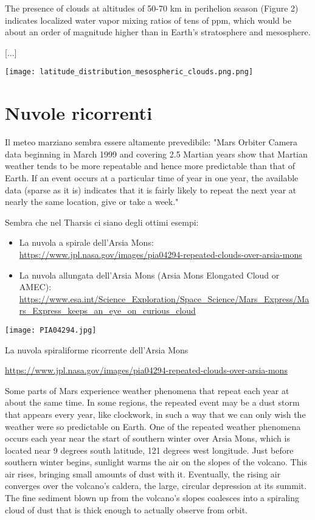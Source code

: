 \documentclass[a4paper,10pt,openany,oneside]{memoir}
\begin{document}
The presence of clouds at altitudes of 50-70 km in perihelion season (Figure 2) indicates localized water vapor mixing ratios of tens of ppm, which would be about an order of magnitude higher than in Earth’s stratosphere and mesosphere.

[...]


\texttt{[image: latitude\_distribution\_mesospheric\_clouds.png.png]}



\section{Nuvole ricorrenti}

Il meteo marziano sembra essere altamente prevedibile:  "Mars Orbiter Camera data beginning in March 1999 and covering 2.5 Martian years show that Martian weather tends to be more repeatable and hence more predictable than that of Earth. If an event occurs at a particular time of year in one year, the available data (sparse as it is) indicates that it is fairly likely to repeat the next year at nearly the same location, give or take a week."

Sembra che nel Tharsis ci siano degli ottimi esempi:
\begin{itemize}
  \item La nuvola a spirale dell'Arsia Mons: \url{https://www.jpl.nasa.gov/images/pia04294-repeated-clouds-over-arsia-mons}
  \item La nuvola allungata dell'Arsia Mons (Arsia Mons Elongated Cloud or AMEC): \url{https://www.esa.int/Science_Exploration/Space_Science/Mars_Express/Mars_Express_keeps_an_eye_on_curious_cloud}
\end{itemize}


\texttt{[image: PIA04294.jpg]}

La nuvola spiraliforme ricorrente dell'Arsia Mons

\url{https://www.jpl.nasa.gov/images/pia04294-repeated-clouds-over-arsia-mons}

Some parts of Mars experience weather phenomena that repeat each year at about the same time. In some regions, the repeated event may be a dust storm that appears every year, like clockwork, in such a way that we can only wish the weather were so predictable on Earth. One of the repeated weather phenomena occurs each year near the start of southern winter over Arsia Mons, which is located near 9 degrees south latitude, 121 degrees west longitude. Just before southern winter begins, sunlight warms the air on the slopes of the volcano. This air rises, bringing small amounts of dust with it. Eventually, the rising air converges over the volcano's caldera, the large, circular depression at its summit. The fine sediment blown up from the volcano's slopes coalesces into a spiraling cloud of dust that is thick enough to actually observe from orbit.
\end{document}
